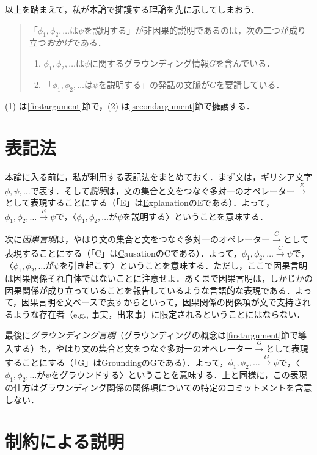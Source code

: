 \documentclass[twoside,11pt,uplatex]{jsarticle}
\theoremstyle{definition}
\begin{document}
以上を踏まえて，私が本論で擁護する理論を先に示してしまおう．
\begin{quote}
「$\phi_1, \phi_2, \ldots$は$\psi$を説明する」が非因果的説明であるのは，次の二つが成り立つ\emph{おかげ}である．
	\begin{enumerate}
	\item $\phi_1, \phi_2, \ldots$は$\psi$に関するグラウンディング情報$G$を含んでいる．	
	\item 「$\phi_1, \phi_2, \ldots$は$\psi$を説明する」の発話の文脈が$G$を要請している．
	\end{enumerate}
\end{quote}

\noindent(1) は\ref{firstargument}節で，(2) は\ref{secondargument}節で擁護する．

\section{表記法}
本論に入る前に，私が利用する表記法をまとめておく．まず文は，ギリシア文字$\phi, \psi, \ldots$で表す．そして\emph{説明}は，文の集合と文をつなぐ多対一のオペレーター$\xrightarrow{E}$として表現することにする（「E」は\underline{E}xplanationのEである）．よって，$\phi_1, \phi_2, \ldots\xrightarrow{E}\psi$で，〈$\phi_1, \phi_2, \ldots$が$\psi$を説明する〉ということを意味する．

次に\emph{因果言明}は，やはり文の集合と文をつなぐ多対一のオペレーター$\xrightarrow{C}$として表現することにする（「C」は\underline{C}ausationのCである）．よって，$\phi_1, \phi_2, \ldots\xrightarrow{C}\psi$で，〈$\phi_1, \phi_2, \ldots$が$\psi$を引き起こす〉ということを意味する．ただし，ここで因果言明は因果関係それ自体ではないことに注意せよ．あくまで因果言明は，しかじかの因果関係が成り立っていることを報告しているような言語的な表現である．よって，因果言明を文ベースで表すからといって，因果関係の関係項が文で支持されるような存在者（e.g., 事実，出来事）に限定されるということにはならない．

最後に\emph{グラウンディング言明}（グラウンディングの概念は\ref{firstargument}節で導入する）も，やはり文の集合と文をつなぐ多対一のオペレーター$\xrightarrow{G}$として表現することにする（「G」は\underline{G}roundingのGである）．よって，$\phi_1, \phi_2, \ldots\xrightarrow{G}\psi$で，〈$\phi_1, \phi_2, \ldots$が$\psi$をグラウンドする〉ということを意味する．上と同様に，この表現の仕方はグラウンディング関係の関係項についての特定のコミットメントを含意しない．

\section{制約による説明}\label{explanationbyconstraint}
\end{document}
